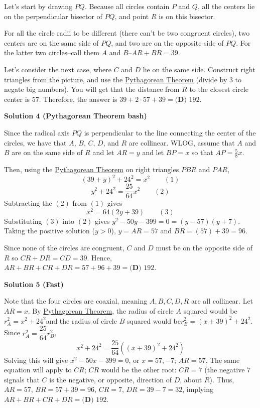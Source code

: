 \begin{enumerate}
Let's start by drawing $PQ$. Because all circles contain $P$ and $Q$, all the centers lie on the perpendicular bisector of $PQ$, and point $R$ is on this bisector.

 For all the circle radii to be different (there can't be two congruent circles), two centers are on the same side of $PQ$, and two are on the opposite side of $PQ$. For the latter two circles--call them $A$ and $B$--$AR+BR=39$.

 Let's consider the next case, where $C$ and $D$ lie on the same side. Construct right triangles from the picture, and use the \href{https://artofproblemsolving.com/wiki/index.php?title=Pythagorean\_Theorem}{Pythagorean Theorem} (divide by 3 to negate big numbers). You will get that the distance from $R$ to the closest circle center is $57$. Therefore, the answer is $39+2\cdot57+39=\boxed{\textbf{(D) }192}$.

 



\textbf{Solution 4 (Pythagorean Theorem bash)}

Since the radical axis $PQ$ is perpendicular to the line connecting the center of the circles, we have that $A$, $B$, $C$, $D$, and $R$ are collinear. WLOG, assume that $A$ and $B$ are on the same side of $R$ and let $AR=y$ and let $BP=x$ so that $AP=\frac{5}{8}x$.

 Then, using the \href{https://artofproblemsolving.com/wiki/index.php?title=Pythagorean\_Theorem}{Pythagorean Theorem} on right triangles $PBR$ and $PAR$,  
 \[(39+y)^2+24^2=x^2\qquad(1)\]
 \[y^2+24^2=\frac{25}{64}x^2\qquad(2)\] Subtracting the $(2)$ from $(1)$ gives 
 \[x^2=64(2y+39)\qquad(3)\]Substituting $(3)$ into $(2)$ gives $y^2-50y-399=0=(y-57)(y+7).$  Taking the positive solution ($y>0$), $y=AR=57$ and $BR=(57)+39=96$. 

 Since none of the circles are congruent, $C$ and $D$ must be on the opposite side of $R$ so $CR+DR=CD=39$. Hence, $AR+BR+CR+DR=57+96+39=\boxed{\textbf{(D) }192}$.

 



\textbf{Solution 5 (Fast)}

Note that the four circles are coaxial, meaning $A,B,C,D,R$ are all collinear. Let $AR=x$. By \href{https://artofproblemsolving.com/wiki/index.php?title=Pythagorean\_Theorem}{Pythagorean Theorem}, the radius of circle $A$ squared would be$r_A^2 = x^2+24^2$and the radius of circle $B$ squared would be$r_B^2 = (x+39)^2+24^2.$Since $r_A^2 = \dfrac{25}{64}r_B^2$,
 \[x^2+24^2 = \dfrac{25}{64}((x+39)^2+24^2)\]Solving this will give $x^2-50x-399 = 0$, or $x=57, -7$; $AR = 57$. The same equation will apply to $CR$; $CR$ would be the other root: $CR=7$ (the negative $7$ signals that $C$ is the negative, or opposite, direction of $D$, about $R$). Thus, $AR = 57$, $BR = 57+39 = 96$, $CR = 7$, $DR = 39-7 = 32$, implying$AR+BR+CR+DR = \boxed{\textbf{(D) }192}$.


\end{enumerate}
